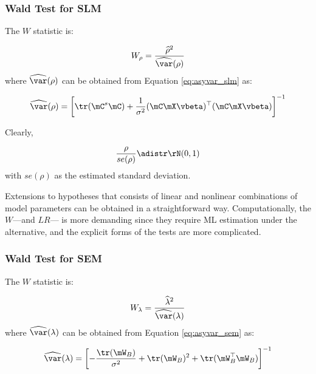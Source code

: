 \documentclass[english,12pt]{book}\usepackage[]{graphicx}\usepackage[]{xcolor}
\begin{document}
\subsubsection{Wald Test for SLM}

The $W$ statistic is:

\begin{equation}
W_{\rho} = \frac{\widehat{\rho}^2}{\widehat{\var}(\rho)}
\end{equation}
%
where $\widehat{\var}(\rho)$ can be obtained from Equation \ref{eq:asyvar_slm} as:

\begin{equation}
  \widehat{\var}(\rho) = \left[\tr(\mC^s\mC) + \frac{1}{\sigma^2}(\mC\mX\vbeta)^\top(\mC\mX\vbeta)\right]^{-1}
\end{equation}

Clearly, 

\begin{equation}
 \frac{\rho}{se(\rho)}\adistr \rN(0, 1)
\end{equation}
%
with $se(\rho)$ as the estimated standard deviation. 

Extensions to hypotheses that consists of linear and nonlinear combinations of model parameters can be obtained in a straightforward way. Computationally, the $W$---and $LR$--- is more demanding since they require ML estimation under the alternative, and the explicit forms of the tests are more complicated.

\subsubsection{Wald Test for SEM}

The $W$ statistic is:

\begin{equation}
W_{\lambda} = \frac{\widehat{\lambda}^2}{\widehat{\var}(\lambda)}
\end{equation}
%
where $\widehat{\var}(\lambda)$ can be obtained from Equation \ref{eq:asyvar_sem} as:

\begin{equation}
  \widehat{\var}(\lambda) = \left[ - \frac{\tr(\mW_B)}{\sigma^2} + \tr(\mW_B)^2 + \tr(\mW_B^\top\mW_B)\right]^{-1}
\end{equation}
\end{document}
